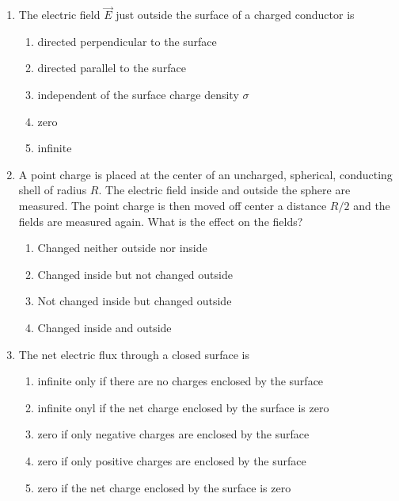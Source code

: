 \documentclass[10pt]{article}
\begin{document}
\begin{enumerate}[itemsep=5mm]
  \item
    The electric field $\vec{E}$ just outside the surface of a
    charged conductor is
    \begin{enumerate}
      \item directed perpendicular to the surface
      \item directed parallel to the surface
      \item independent of the surface charge density $\sigma$
      \item zero
      \item infinite
    \end{enumerate}

  \item
    A point charge is placed at the center of an uncharged,
    spherical, conducting shell of radius $R$.  The electric field
    inside and outside the sphere are measured.  The point charge is
    then moved off center a distance $R/2$ and the fields are measured
    again.  What is the effect on the fields?
    \begin{enumerate}
      \item Changed neither outside nor inside
      \item Changed inside but not changed outside
      \item Not changed inside but changed outside
      \item Changed inside and outside
    \end{enumerate}

  \item
    The net electric flux through a closed surface is
    \begin{enumerate}
      \item infinite only if there are no charges enclosed by the
        surface
      \item infinite onyl if the net charge enclosed by the surface is
        zero
      \item zero if only negative charges are enclosed by the surface
      \item zero if only positive charges are enclosed by the surface
      \item zero if the net charge enclosed by the surface is zero
    \end{enumerate}


\end{enumerate}
\end{document}
